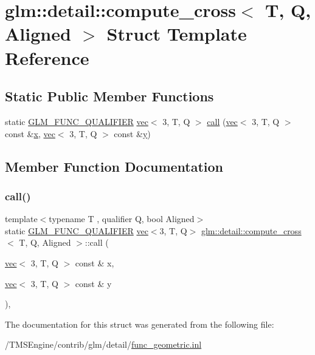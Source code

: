 \hypertarget{structglm_1_1detail_1_1compute__cross}{}\section{glm\+:\+:detail\+:\+:compute\+\_\+cross$<$ T, Q, Aligned $>$ Struct Template Reference}
\label{structglm_1_1detail_1_1compute__cross}
\subsection*{Static Public Member Functions}
\begin{DoxyCompactItemize}
\item 
static \hyperlink{setup_8hpp_a33fdea6f91c5f834105f7415e2a64407}{G\+L\+M\+\_\+\+F\+U\+N\+C\+\_\+\+Q\+U\+A\+L\+I\+F\+I\+ER} \hyperlink{structglm_1_1vec}{vec}$<$ 3, T, Q $>$ \hyperlink{structglm_1_1detail_1_1compute__cross_af67135252e5e44f52bd67878a11dee13}{call} (\hyperlink{structglm_1_1vec}{vec}$<$ 3, T, Q $>$ const \&\hyperlink{_s_d_l__opengl_8h_ad0e63d0edcdbd3d79554076bf309fd47}{x}, \hyperlink{structglm_1_1vec}{vec}$<$ 3, T, Q $>$ const \&\hyperlink{_s_d_l__opengl_8h_a1675d9d7bb68e1657ff028643b4037e3}{y})
\end{DoxyCompactItemize}


\subsection{Member Function Documentation}
\mbox{\label{structglm_1_1detail_1_1compute__cross_af67135252e5e44f52bd67878a11dee13}} 
\subsubsection{\texorpdfstring{call()}{call()}}
{\footnotesize\ttfamily template$<$typename T , qualifier Q, bool Aligned$>$ \\
static \hyperlink{setup_8hpp_a33fdea6f91c5f834105f7415e2a64407}{G\+L\+M\+\_\+\+F\+U\+N\+C\+\_\+\+Q\+U\+A\+L\+I\+F\+I\+ER} \hyperlink{structglm_1_1vec}{vec}$<$3, T, Q$>$ \hyperlink{structglm_1_1detail_1_1compute__cross}{glm\+::detail\+::compute\+\_\+cross}$<$ T, Q, Aligned $>$\+::call (\begin{DoxyParamCaption}\item[{\hyperlink{structglm_1_1vec}{vec}$<$ 3, T, Q $>$ const \&}]{x,  }\item[{\hyperlink{structglm_1_1vec}{vec}$<$ 3, T, Q $>$ const \&}]{y }\end{DoxyParamCaption})\hspace{0.3cm}{\ttfamily [inline]}, {\ttfamily [static]}}



The documentation for this struct was generated from the following file\+:\begin{DoxyCompactItemize}
\item 
/\+T\+M\+S\+Engine/contrib/glm/detail/\hyperlink{func__geometric_8inl}{func\+\_\+geometric.\+inl}\end{DoxyCompactItemize}
